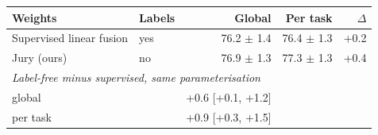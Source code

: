 \begin{tabular}{llrrr}
\toprule
Weights & Labels & Global & Per task & $\Delta$ \\
\midrule
Supervised linear fusion & yes & 76.2 $\pm$ 1.4 & 76.4 $\pm$ 1.3 & +0.2 \\
Jury (ours) & no & 76.9 $\pm$ 1.3 & 77.3 $\pm$ 1.3 & +0.4 \\
\midrule
\multicolumn{5}{l}{\emph{Label-free minus supervised, same parameterisation}} \\
\quad global & & +0.6 [+0.1, +1.2] & & \\
\quad per task & & +0.9 [+0.3, +1.5] & & \\
\bottomrule
\end{tabular}
